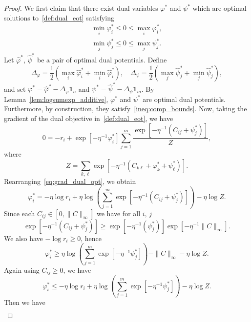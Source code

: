 \documentclass[10pt,a4paper]{amsart}
\newcommand{\one}{\mathbf{1}}
\begin{document}
\begin{proof}
    We first claim that there exist dual variables $\varphi^*$ and $\psi^*$ which are optimal solutions to~\eqref{def:dual_eot} satisfying
    \begin{align}
        \nonumber\min_i\varphi^*_i\leq 0\leq \max_i\varphi^*_i,\\
        \min_j\psi^*_j\leq 0\leq \max_j\psi^*_j.\label{ineq:comp_bounds}
    \end{align}
    Let $\hat\varphi^*$, $\hat\psi^*$ be a pair of optimal dual potentials. Define \[
        \Delta_\varphi=\frac{1}{2}(\max_i\hat\varphi_i^*+\min_i\hat\varphi_i^*),\quad
        \Delta_\psi=\frac{1}{2}(\max_j\hat\psi_j^*+\min_j\hat\psi_j^*),
    \]
    and set $\varphi^*=\hat\varphi^* - \Delta_\varphi\one_n$ and $\psi^*=\hat\psi^* - \Delta_\psi\one_m$.
    By Lemma~\ref{lem:logsumexp_additive}, $\varphi^*$ and $\psi^*$ are optimal dual potentials. Furthermore, by construction, they satisfy~\eqref{ineq:comp_bounds}.
    Now, taking the gradient of the dual objective in~\eqref{def:dual_eot}, we have
    \begin{equation}\label{eq:grad_dual_opt}
        0=-r_i +\exp[-\eta ^{-1}\varphi^*_i]\sum_{j=1}^m\frac{\exp[-\eta ^{-1}(C_{ij}+\psi^*_j)]}{Z},
    \end{equation}
    where
    \[Z=\sum_{k,\ell}\exp[-\eta ^{-1}(C_{k\ell}+\varphi^*_k+\psi^*_\ell)].\]
    Rearranging~\eqref{eq:grad_dual_opt}, we obtain
    \begin{equation*}
        \varphi^*_i=-\eta \log r_i + \eta \log\left(\sum_{j=1}^m\exp[-\eta ^{-1}(C_{ij}+\psi^*_j)]\right) - \eta \log Z.
    \end{equation*}
    Since each $C_{ij}\in[0, \|C\|_\infty]$ we have for all $i$, $j$
    \begin{equation*}
    \exp[-\eta ^{-1}(C_{ij}+\psi^*_j)]\geq \exp[-\eta ^{-1}(\psi^*_j)]\exp[-\eta ^{-1}\|C\|_\infty].
    \end{equation*}
    We also have $-\log r_i\geq 0$, hence
    \begin{equation*}
        \varphi^*_i\geq  \eta \log\left(\sum_{j=1}^m\exp[-\eta ^{-1}\psi^*_j]\right) -\|C\|_\infty - \eta \log Z.
    \end{equation*}
    Again using $C_{ij}\geq 0$, we have
    \begin{equation*}
        \varphi^*_i\leq -\eta \log r_i + \eta \log\left(\sum_{j=1}^m\exp[-\eta ^{-1}\psi^*_j]\right) - \eta \log Z.
    \end{equation*}
    Then we have
    \begin{align*}

\end{align*}
\end{proof}
\end{document}
